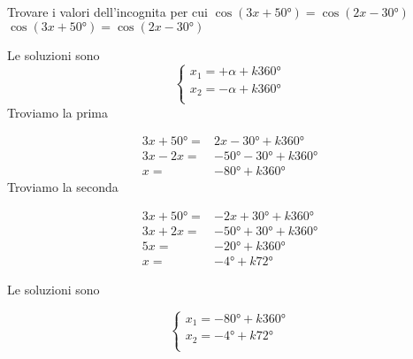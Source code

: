 \begin{exercise}
	Trovare i valori dell'incognita per cui $\cos(3x+\ang{50;;})=\cos(2x-\ang{30;;})$
	\tcblower
	$\cos(3x+\ang{50;;})=\cos(2x-\ang{30;;})$
	
	Le soluzioni sono 
	\[\begin{cases}
	x_1=+\alpha+k\ang{360;;}\\
	x_2=-\alpha+k\ang{360;;}\\
	\end{cases}\]
	Troviamo la prima
	
	\begin{align*}
	3x+\ang{50;;}=&2x-\ang{30;;}+k\ang{360;;}\\
	3x-2x=&-\ang{50;;}-\ang{30;;}+k\ang{360;;}\\
	x=&-\ang{80;;}+k\ang{360;;}
	\end{align*}
 Troviamo la seconda
	
	\begin{align*}
	3x+\ang{50;;}=&-2x+\ang{30;;}+k\ang{360;;}\\
	3x+2x=&-\ang{50;;}+\ang{30;;}+k\ang{360;;}\\
	5x=&-\ang{20;;}+k\ang{360;;}\\
 x=&-\ang{4;;}+k\ang{72;;}
	\end{align*}
	
	Le soluzioni sono
	
	\[\begin{cases}
	x_1=-\ang{80;;}+k\ang{360;;}\\
	x_2=-\ang{4;;}+k\ang{72;;}\\
	\end{cases}\]
\end{exercise}
